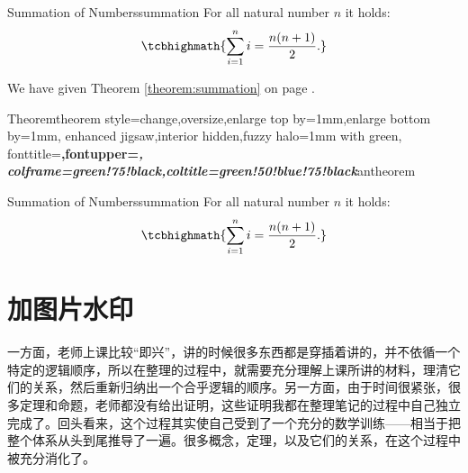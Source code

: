\documentclass{ctexart}
\begin{document}
\begin{theo}{Summation of Numbers}{summation}
  For all natural number $n$ it holds:
  \begin{equation}
  \tcbhighmath{\sum\limits_{i=1}^n i = \frac{n(n+1)}{2}.}
  \end{equation}
\end{theo}

We have given Theorem \ref{theorem:summation} on page \pageref{theorem:summation}.

%
  {Theorem}{theorem style=change,oversize,enlarge top by=1mm,enlarge bottom by=1mm,
    enhanced jigsaw,interior hidden,fuzzy halo=1mm with green,
     fonttitle=\bfseries\upshape,fontupper=\slshape,
     colframe=green!75!black,coltitle=green!50!blue!75!black}{antheorem}

\begin{antheo}{Summation of Numbers}{summation}
  For all natural number $n$ it holds:
  \begin{equation}
  \tcbhighmath{\sum\limits_{i=1}^n i = \frac{n(n+1)}{2}.}
  \end{equation}
\end{antheo}

\section{加图片水印}

\begin{tcolorbox}[enhanced,watermark graphics=Picture/海琴烟.jpg,
  watermark opacity=0.3,watermark zoom=0.9,
  colback=green!5!white,colframe=green!75!black,
  fonttitle=\bfseries, title=Box with a watermark picture]
  一方面，老师上课比较“即兴”，讲的时候很多东西都是穿插着讲的，并不依循一个特定的逻辑顺序，所以在整理的过程中，就需要充分理解上课所讲的材料，理清它们的关系，然后重新归纳出一个合乎逻辑的顺序。另一方面，由于时间很紧张，很多定理和命题，老师都没有给出证明，这些证明我都在整理笔记的过程中自己独立完成了。回头看来，这个过程其实使自己受到了一个充分的数学训练——相当于把整个体系从头到尾推导了一遍。很多概念，定理，以及它们的关系，在这个过程中被充分消化了。
\end{tcolorbox}

\end{document}

